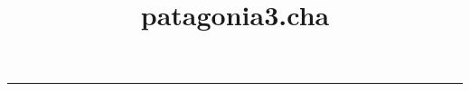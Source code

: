 \documentclass[a4paper,10pt]{article}
\title{patagonia3.cha}
\author{}
\date{}
\begin{document}
\maketitle

\renewcommand{\abstractname}{Conversation details}


\rule{\linewidth}{0.2mm}\\[0.5cm]
\end{document}
